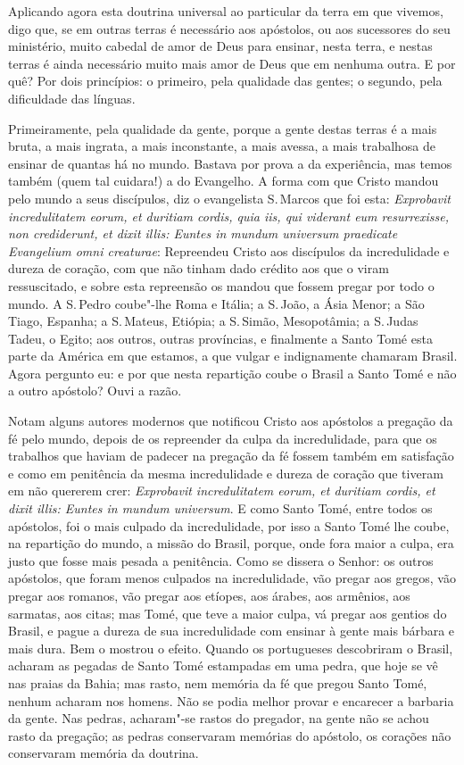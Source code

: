 Aplicando agora esta doutrina universal ao particular da terra em que
vivemos, digo que, se em outras terras é necessário aos apóstolos, ou
aos sucessores do seu ministério, muito cabedal de amor de Deus para
ensinar, nesta terra, e nestas terras é ainda necessário muito mais amor
de Deus que em nenhuma outra. E por quê? Por dois princípios: o
primeiro, pela qualidade das gentes; o segundo, pela dificuldade das
línguas.

Primeiramente, pela qualidade da gente, porque a gente destas terras é a
mais bruta, a mais ingrata, a mais inconstante, a mais avessa, a mais
trabalhosa de ensinar de quantas há no mundo. Bastava por prova a da
experiência, mas temos também (quem tal cuidara!) a do Evangelho.
A forma com que Cristo mandou pelo mundo a seus discípulos, diz o
evangelista S.\,Marcos que foi esta: \emph{Exprobavit incredulitatem
eorum, et duritiam cordis, quia iis, qui viderant eum resurrexisse, non
crediderunt, et dixit illis: Euntes in mundum universum praedicate
Evangelium omni creaturae}: Repreendeu Cristo aos %
discípulos da incredulidade e dureza de coração, com que não tinham dado
crédito aos que o viram ressuscitado, e sobre esta repreensão os mandou
que fossem pregar por todo o mundo. A S.\,Pedro coube"-lhe Roma e
Itália; a S.\,João, a Ásia Menor; a São Tiago, Espanha; a S.\,Mateus,
Etiópia; a S.\,Simão, Mesopotâmia; a S.\,Judas Tadeu, o Egito; aos outros,
outras províncias, e finalmente a Santo Tomé esta parte da América em
que estamos, a que vulgar e indignamente chamaram Brasil. Agora pergunto
eu: e por que nesta repartição coube o Brasil a Santo Tomé e não a outro
apóstolo? Ouvi a razão.

Notam alguns autores modernos que notificou Cristo aos apóstolos a
pregação da fé pelo mundo, depois de os repreender da culpa da
incredulidade, para que os trabalhos que haviam de padecer na pregação
da fé fossem também em satisfação e como em penitência da mesma
incredulidade e dureza de coração que tiveram em não quererem crer:
\emph{Exprobavit incredulitatem eorum, et duritiam cordis, et dixit
illis: Euntes in mundum universum}. E como Santo Tomé, entre todos os
apóstolos, foi o mais culpado da incredulidade, por isso a Santo Tomé
lhe coube, na repartição do mundo, a missão do Brasil, porque, onde fora
maior a culpa, era justo que fosse mais pesada a penitência. Como se
dissera o Senhor: os outros apóstolos, que foram menos culpados na
incredulidade, vão
pregar aos gregos, vão pregar aos romanos, vão pregar aos etíopes, aos
árabes, aos armênios, aos sarmatas, aos citas; mas Tomé, que teve a
maior culpa, vá pregar aos gentios do Brasil, e pague a dureza de sua
incredulidade com ensinar à gente mais bárbara e mais dura. Bem o
mostrou o efeito. Quando os portugueses descobriram o Brasil, acharam as
pegadas de Santo Tomé estampadas em uma pedra, que hoje se vê nas praias
da Bahia; mas rasto, nem memória da fé que pregou Santo Tomé, nenhum
acharam nos homens. Não se podia melhor provar e encarecer a barbaria da
gente. Nas pedras, acharam"-se rastos do pregador, na gente não se achou
rasto da pregação; as pedras conservaram memórias do apóstolo, os
corações não conservaram memória da doutrina.

